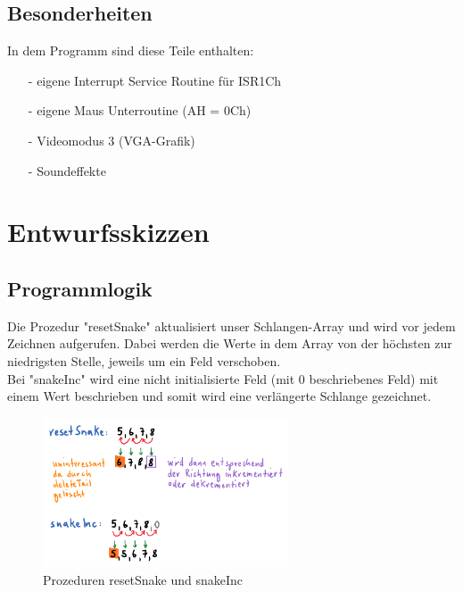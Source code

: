 \documentclass[a4paper,10pt]{article}
\begin{document}
		\subsection{Besonderheiten}
			In dem Programm sind diese Teile enthalten:
			\begin{itemize}
				\item[-] eigene Interrupt Service Routine für ISR1Ch
				\item[-] eigene Maus Unterroutine (AH = 0Ch)
				\item[-] Videomodus 3 (VGA-Grafik)
				\item[-] Soundeffekte
			\end{itemize}
		\newpage
	\section{Entwurfsskizzen}
		
		\subsection{Programmlogik}
			Die Prozedur "resetSnake" \- aktualisiert unser Schlangen-Array und 
			wird vor jedem Zeichnen aufgerufen. Dabei werden die Werte in dem 
			Array von der höchsten zur niedrigsten Stelle, jeweils um ein Feld 
			verschoben. \\
			Bei "snakeInc" \- wird eine nicht initialisierte Feld (mit 0 
			beschriebenes Feld) mit einem Wert beschrieben und somit wird 
			eine verlängerte Schlange gezeichnet. \\
			\begin{figure}[h]
				\centering
				\includegraphics[width=0.65\textwidth]{prog}
				\caption{Prozeduren resetSnake und snakeInc}
				\label{SnakPro}
			\end{figure}
			
\end{document}
